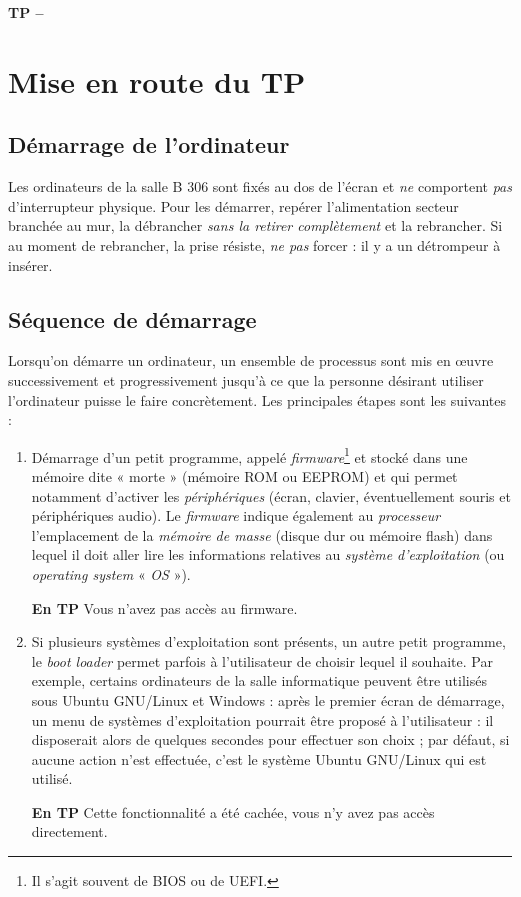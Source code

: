 

%



\begin{center}
{\Large\bf TP \no {\numero} -- \descrip}
\end{center}

\section{Mise en route du TP}
\subsection{Démarrage  de l'ordinateur} 

Les ordinateurs de la salle B 306 sont fixés au dos de l'écran et \emph{ne} comportent \emph{pas} d'interrupteur physique. Pour les démarrer, repérer l'alimentation secteur branchée au mur, la débrancher \emph{sans la retirer complètement} et la rebrancher. Si au moment de rebrancher, la prise résiste, \emph{ne pas} forcer : il y a un détrompeur à insérer. 

\subsection{Séquence de démarrage}

Lorsqu'on démarre un ordinateur, un ensemble de processus sont mis en œuvre successivement et progressivement jusqu'à ce que la personne désirant utiliser l'ordinateur puisse le faire concrètement. Les principales étapes sont les suivantes :
\begin{enumerate}
 \item Démarrage d'un petit programme, appelé \textit{firmware}\footnote{Il s'agit souvent de BIOS ou de UEFI.} et stocké dans une mémoire dite « morte » (mémoire ROM ou EEPROM) et qui permet notamment d'activer les \textit{périphériques} (écran, clavier, éventuellement souris et périphériques audio). Le \textit{firmware} indique également au \textit{processeur} l'emplacement de la \textit{mémoire de masse} (disque dur ou mémoire flash) dans lequel il doit aller lire les informations relatives au \textit{système d'exploitation} (ou \textit{operating system} « \textit{OS} »).
 
 \textbf{En TP} Vous n'avez pas accès au firmware.
 
 \item Si plusieurs systèmes d'exploitation sont présents, un autre petit programme, le \textit{boot loader} permet parfois à l'utilisateur de choisir lequel il souhaite. Par exemple, certains ordinateurs de la salle informatique peuvent être utilisés sous Ubuntu GNU/Linux et Windows : après le premier écran de démarrage, un menu de systèmes d'exploitation pourrait être proposé à l'utilisateur : il disposerait alors de quelques secondes pour effectuer son choix ; par défaut, si aucune action n'est effectuée, c'est le système Ubuntu GNU/Linux qui est utilisé. 
 
 \textbf{En TP} Cette fonctionnalité a été cachée, vous n'y avez pas accès directement.
\end{enumerate}

